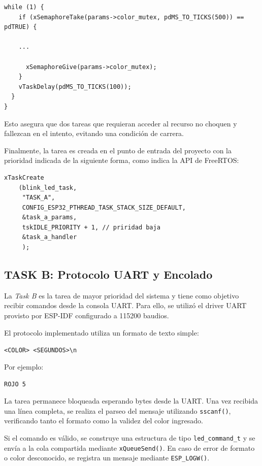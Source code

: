 \documentclass[12pt,letterpaper]{article}
\begin{document}
\begin{lstlisting}
while (1) {
    if (xSemaphoreTake(params->color_mutex, pdMS_TO_TICKS(500)) == pdTRUE) {
    
    ...

      xSemaphoreGive(params->color_mutex);
    }
    vTaskDelay(pdMS_TO_TICKS(100));
  }
}
\end{lstlisting}

Esto asegura que dos tareas que requieran acceder al recurso no choquen y fallezcan en el intento, evitando una condición de carrera.

Finalmente, la tarea es creada en el punto de entrada del proyecto con la prioridad indicada de la siguiente forma, como indica la API de FreeRTOS:
\begin{lstlisting}
xTaskCreate
    (blink_led_task,              
     "TASK_A",
     CONFIG_ESP32_PTHREAD_TASK_STACK_SIZE_DEFAULT,
     &task_a_params,
     tskIDLE_PRIORITY + 1, // priridad baja
     &task_a_handler
     );
\end{lstlisting}

\subsection{TASK B: Protocolo UART y Encolado}

La \textit{Task B} es la tarea de mayor prioridad del sistema y tiene como objetivo recibir comandos desde la consola UART. Para ello, se utilizó el driver UART provisto por ESP-IDF configurado a 115200 baudios.

El protocolo implementado utiliza un formato de texto simple:

\begin{center}
\texttt{<COLOR> <SEGUNDOS>\textbackslash n}
\end{center}

Por ejemplo:

\begin{center}
\texttt{ROJO 5}
\end{center}

La tarea permanece bloqueada esperando bytes desde la UART. Una vez recibida una línea completa, se realiza el parseo del mensaje utilizando \texttt{sscanf()}, verificando tanto el formato como la validez del color ingresado.

Si el comando es válido, se construye una estructura de tipo \texttt{led\_command\_t} y se envía a la cola compartida mediante \texttt{xQueueSend()}. En caso de error de formato o color desconocido, se registra un mensaje mediante \texttt{ESP\_LOGW()}.
\end{document}

